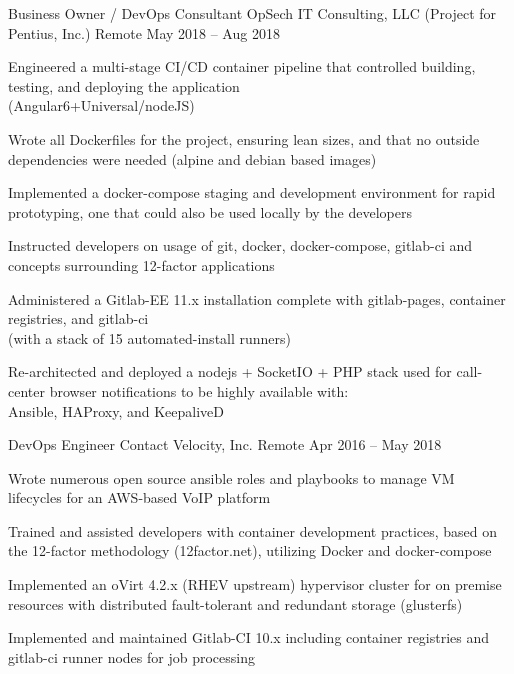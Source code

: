 \begin{cventries}
	\cventry
	{Business Owner / DevOps Consultant}
	{OpSech IT Consulting, LLC (Project for Pentius, Inc.)}
	{Remote}
	{May 2018 – Aug 2018}
	{\begin{cvitems}
		\item Engineered a multi-stage CI/CD container pipeline that controlled building, testing, and deploying the application \\ (Angular6+Universal/nodeJS)
		\item Wrote all Dockerfiles for the project, ensuring lean sizes, and that no outside dependencies were needed (alpine and debian based images)
		\item Implemented a docker-compose staging and development environment for rapid prototyping, one that could also be used locally by the developers
		\item Instructed developers on usage of git, docker, docker-compose, gitlab-ci and concepts surrounding 12-factor applications
		\item Administered a Gitlab-EE 11.x installation complete with gitlab-pages, container registries, and gitlab-ci \\ (with a stack of 15 automated-install runners)
		\item Re-architected and deployed a nodejs + SocketIO + PHP stack used for call-center browser notifications to be highly available with: \\ Ansible, HAProxy, and KeepaliveD
		\end{cvitems}}
	\cventry
	{DevOps Engineer}
	{Contact Velocity, Inc.}
	{Remote}
	{Apr 2016 – May 2018}
	{\begin{cvitems}
		\item {Wrote numerous open source ansible roles and playbooks to manage VM lifecycles for an AWS-based VoIP platform}
		\item {Trained and assisted developers with container development practices, based on the 12-factor methodology (12factor.net), utilizing Docker and docker-compose}
		\item {Implemented an oVirt 4.2.x (RHEV upstream) hypervisor cluster for on premise resources with distributed fault-tolerant and redundant storage (glusterfs)}
		\item {Implemented and maintained Gitlab-CI 10.x including container registries and gitlab-ci \textquotedbl{}runner\textquotedbl{} nodes for job processing}

\end{cvitems}}
\end{cventries}
